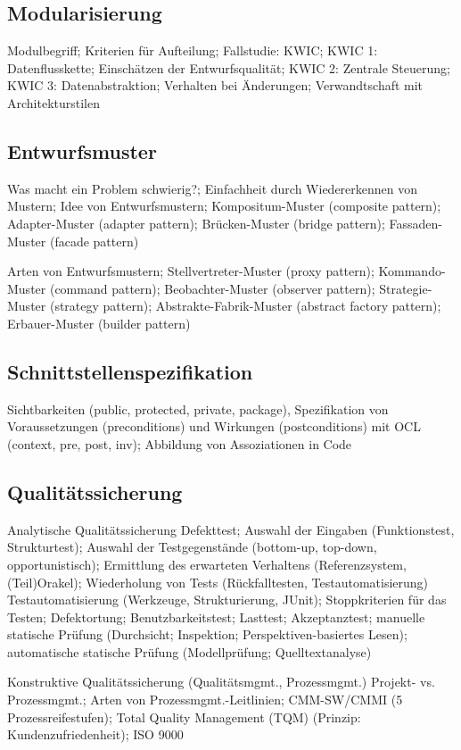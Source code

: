 \subsection{Modularisierung}
Modulbegriff; Kriterien für Aufteilung;
Fallstudie: KWIC;
KWIC 1: Datenflusskette; Einschätzen der Entwurfsqualität;
KWIC 2: Zentrale Steuerung;
KWIC 3: Datenabstraktion; Verhalten bei Änderungen; Verwandtschaft mit Architekturstilen 

\subsection{Entwurfsmuster}
Was macht ein Problem schwierig?; Einfachheit durch Wiedererkennen von Mustern;
Idee von Entwurfsmustern;
Kompositum-Muster (composite pattern);
Adapter-Muster (adapter pattern);
Brücken-Muster (bridge pattern);
Fassaden-Muster (facade pattern) 

Arten von Entwurfsmustern;
Stellvertreter-Muster (proxy pattern);
Kommando-Muster (command pattern);
Beobachter-Muster (observer pattern);
Strategie-Muster (strategy pattern);
Abstrakte-Fabrik-Muster (abstract factory pattern);
Erbauer-Muster (builder pattern) 

\subsection{Schnittstellenspezifikation}
Sichtbarkeiten (public, protected, private, package),
Spezifikation von Voraussetzungen (preconditions) und Wirkungen (postconditions) mit OCL
(context, pre, post, inv);
Abbildung von Assoziationen in Code

\subsection{Qualitätssicherung}

Analytische Qualitätssicherung
Defekttest;
Auswahl der Eingaben (Funktionstest, Strukturtest); Auswahl der Testgegenstände (bottom-up, top-down, opportunistisch);
Ermittlung des erwarteten Verhaltens (Referenzsystem, (Teil)Orakel); Wiederholung von Tests (Rückfalltesten, Testautomatisierung) 
Testautomatisierung (Werkzeuge, Strukturierung, JUnit);
Stoppkriterien für das Testen;
Defektortung;
Benutzbarkeitstest;
Lasttest;
Akzeptanztest;
manuelle statische Prüfung (Durchsicht; Inspektion; Perspektiven-basiertes Lesen);
automatische statische Prüfung (Modellprüfung; Quelltextanalyse) 

Konstruktive Qualitätssicherung (Qualitätsmgmt., Prozessmgmt.)
Projekt- vs. Prozessmgmt.;
Arten von Prozessmgmt.-Leitlinien;
CMM-SW/CMMI (5 Prozessreifestufen);
Total Quality Management (TQM) (Prinzip: Kundenzufriedenheit); ISO 9000 

